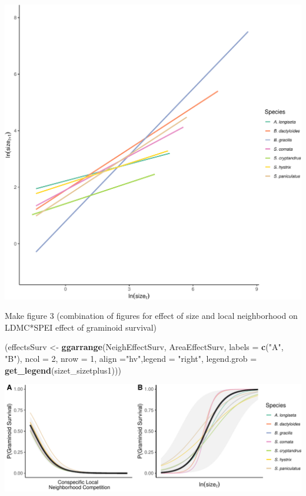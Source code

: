 \documentclass[
]{article}
\newenvironment{Shaded}{\begin{snugshade}}{\end{snugshade}}
\newcommand{\DataTypeTok}[1]{\textcolor[rgb]{0.13,0.29,0.53}{#1}}
\newcommand{\DecValTok}[1]{\textcolor[rgb]{0.00,0.00,0.81}{#1}}
\newcommand{\KeywordTok}[1]{\textcolor[rgb]{0.13,0.29,0.53}{\textbf{#1}}}
\newcommand{\NormalTok}[1]{#1}
\newcommand{\StringTok}[1]{\textcolor[rgb]{0.31,0.60,0.02}{#1}}
\begin{document}
\includegraphics{figures/unnamed-chunk-11-1.pdf}

Make figure 3 (combination of figures for effect of size and local
neighborhood on LDMC*SPEI effect of graminoid survival)

\begin{Shaded}
\begin{Highlighting}[]
\NormalTok{(effectsSurv \textless{}{-}}\StringTok{ }\KeywordTok{ggarrange}\NormalTok{(NeighEffectSurv, AreaEffectSurv, }
          \DataTypeTok{labels =} \KeywordTok{c}\NormalTok{(}\StringTok{"A"}\NormalTok{, }\StringTok{"B"}\NormalTok{),}
          \DataTypeTok{ncol =} \DecValTok{2}\NormalTok{, }\DataTypeTok{nrow =} \DecValTok{1}\NormalTok{, }\DataTypeTok{align =}\StringTok{"hv"}\NormalTok{,}\DataTypeTok{legend =} \StringTok{"right"}\NormalTok{,}
          \DataTypeTok{legend.grob =} \KeywordTok{get\_legend}\NormalTok{(sizet\_sizetplus1)))}
\end{Highlighting}
\end{Shaded}

\includegraphics{figures/survEffectPlots-1.pdf}
\end{document}
